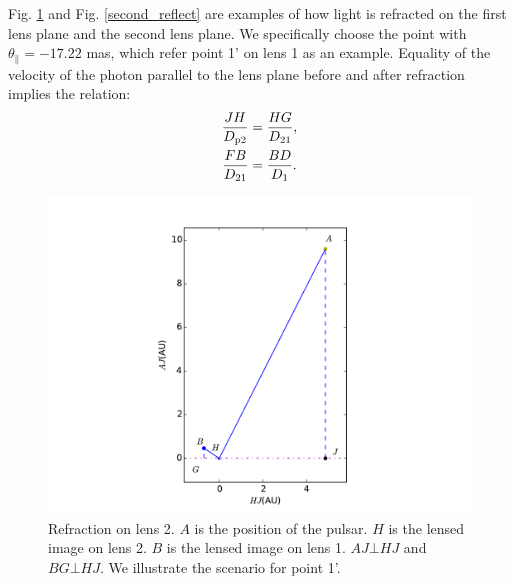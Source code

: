 \documentclass[useAMS,usenatbib]{mn2e}
\begin{document}
Fig. \ref{first_reflect} and Fig. \ref{second_reflect} are examples of how light is refracted on the first lens plane and the second lens plane.  We specifically choose the point with $\theta_{\parallel}=-17.22$ mas, which refer point 1' on lens 1 as an example.  
Equality of the velocity of the photon parallel to the lens plane before and after refraction implies the relation:
\begin{equation}
\begin{aligned}
\frac{JH}{D_{\rm p2}}&=\frac{HG}{D_{21}},\\
\frac{FB}{D_{21}}&=\frac{BD}{D_{1}}.
\end{aligned}
\end{equation}


\begin{figure}
\centering
\includegraphics[width=1.0\linewidth,scale=1.0]{First_reflection.pdf}
\caption{Refraction on lens 2. 
$A$ is the position of the pulsar.  $H$ is the lensed image on lens 2.  $B$ is
the lensed image on lens 1.  $AJ\bot HJ$ and $BG\bot HJ$.  We illustrate the scenario for point 1'.}
\label{first_reflect}
\end{figure}
\end{document}
